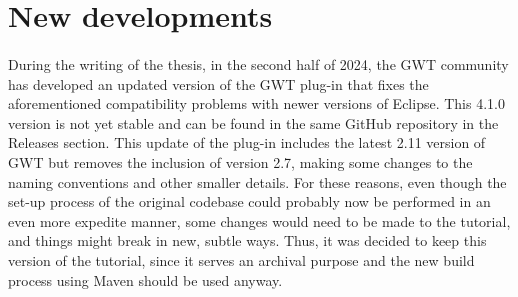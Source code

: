 \section{New developments}
\paragraph{}
During the writing of the thesis, in the second half of 2024, the GWT community has developed an updated version of the GWT plug-in that fixes the aforementioned compatibility problems with newer versions of Eclipse. This 4.1.0 version is not yet stable and can be found in the same GitHub repository \cite{web:gwtplugingit} in the Releases section. This update of the plug-in includes the latest 2.11 version of GWT but removes the inclusion of version 2.7, making some changes to the naming conventions and other smaller details. For these reasons, even though the set-up process of the original codebase could probably now be performed in an even more expedite manner, some changes would need to be made to the tutorial, and things might break in new, subtle ways. Thus, it was decided to keep this version of the tutorial, since it serves an archival purpose and the new build process using Maven should be used anyway.